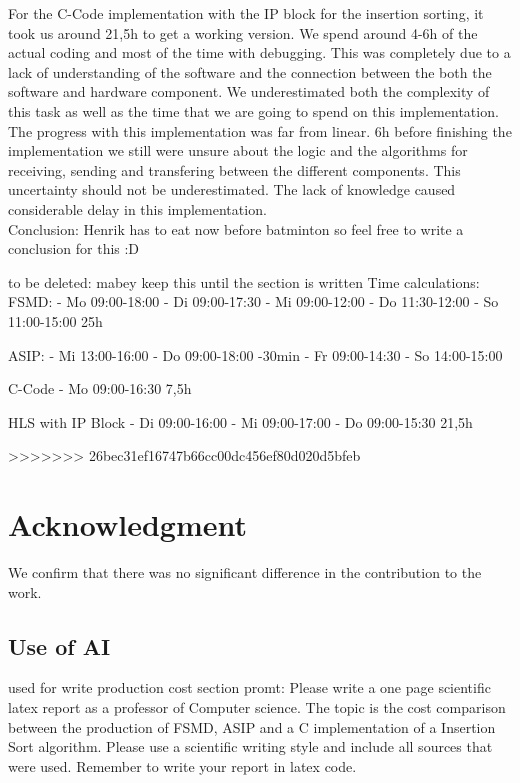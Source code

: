 \documentclass[conference]{IEEEtran}
\begin{document}
For the C-Code implementation with the IP block for the insertion sorting, it took us around 21,5h to get a working version. We spend around 4-6h of the actual coding and most of the time with debugging. This was completely due to a lack of understanding of the software and the connection between the both the software and hardware component. We underestimated both the complexity of this task as well as the time that we are going to spend on this implementation. The progress with this implementation was far from linear. 6h before finishing the implementation we still were unsure about the logic and the algorithms for receiving, sending and transfering between the different components. This uncertainty should not be underestimated. The lack of knowledge caused considerable delay in this implementation. \\
Conclusion: Henrik has to eat now before batminton so feel free to write a conclusion for this :D

to be deleted: 
mabey keep this until the section is written
Time calculations:
FSMD:
- Mo 09:00-18:00
- Di 09:00-17:30
- Mi 09:00-12:00
- Do 11:30-12:00
- So 11:00-15:00
25h

ASIP:
- Mi 13:00-16:00
- Do 09:00-18:00 -30min
- Fr 09:00-14:30
- So 14:00-15:00


C-Code
- Mo 09:00-16:30
7,5h

HLS with IP Block
- Di 09:00-16:00
- Mi 09:00-17:00
- Do 09:00-15:30
21,5h



>>>>>>> 26bec31ef16747b66cc00dc456ef80d020d5bfeb
\section*{Acknowledgment}

We confirm that there was no significant difference in the contribution to the work.

\printbibliography

\begin{appendices}
\section{Use of AI}
used for write production cost section promt: Please write a one page scientific latex report as a professor of Computer science. The topic is the cost comparison between the production of FSMD, ASIP and a C implementation of a Insertion Sort algorithm. Please use a scientific writing style and include all sources that were used. Remember to write your report in latex code.
\end{appendices}
\end{document}

